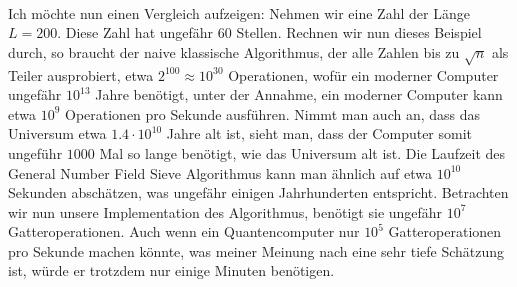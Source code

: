 \paragraph{}

Ich möchte nun einen Vergleich aufzeigen: Nehmen wir eine Zahl der Länge $L = 200$. Diese Zahl hat ungefähr $60$ Stellen. Rechnen wir nun dieses Beispiel durch, so braucht der naive klassische Algorithmus, der alle Zahlen bis zu $\sqrt{n}$ als Teiler ausprobiert, etwa $2^{100} \approx 10^{30}$ Operationen, wofür ein moderner Computer ungefähr $10^{13}$ Jahre benötigt, unter der Annahme, ein moderner Computer kann etwa $10^9$ Operationen pro Sekunde ausführen. Nimmt man auch an, dass das Universum etwa $1.4 \cdot 10^{10}$ Jahre alt ist, sieht man, dass der Computer somit ungeführ $1000$ Mal so lange benötigt, wie das Universum alt ist. Die Laufzeit des General Number Field Sieve Algorithmus kann man ähnlich auf etwa $10^{10}$ Sekunden abschätzen, was ungefähr einigen Jahrhunderten entspricht. Betrachten wir nun unsere Implementation des Algorithmus, benötigt sie ungefähr $10^7$ Gatteroperationen. Auch wenn ein Quantencomputer nur $10^5$ Gatteroperationen pro Sekunde machen könnte, was meiner Meinung nach eine sehr tiefe Schätzung ist, würde er trotzdem nur einige Minuten benötigen.